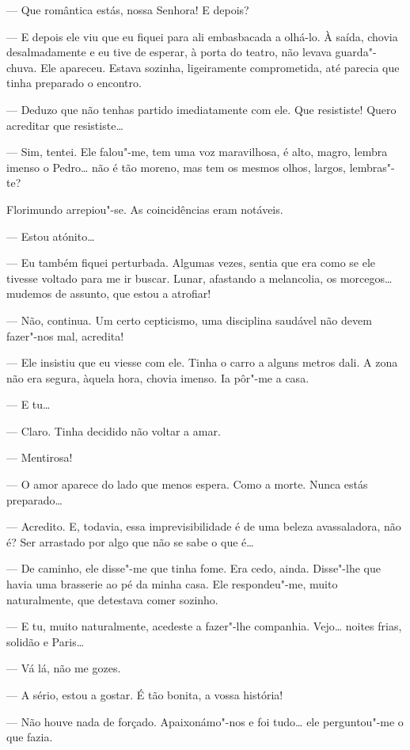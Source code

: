 --- Que romântica estás, nossa Senhora! E depois?

--- E depois ele viu que eu fiquei para ali embasbacada a olhá-lo. À
saída, chovia desalmadamente e eu tive de esperar, à porta do teatro,
não levava guarda"-chuva. Ele apareceu. Estava sozinha, ligeiramente
comprometida, até parecia que tinha preparado o encontro.

--- Deduzo que não tenhas partido imediatamente com ele. Que resististe!
Quero acreditar que resististe\ldots{}

--- Sim, tentei. Ele falou"-me, tem uma voz maravilhosa, é alto, magro,
lembra imenso o Pedro\ldots{} não é tão moreno, mas tem os mesmos olhos,
largos, lembras"-te?

Florimundo arrepiou"-se. As coincidências eram notáveis.

--- Estou atónito\ldots{}

--- Eu também fiquei perturbada. Algumas vezes, sentia que era como se ele
tivesse voltado para me ir buscar. Lunar, afastando a melancolia, os
morcegos\ldots{} mudemos de assunto, que estou a atrofiar!

--- Não, continua. Um certo cepticismo, uma disciplina saudável não devem
fazer"-nos mal, acredita!

--- Ele insistiu que eu viesse com ele. Tinha o carro a alguns metros
dali. A zona não era segura, àquela hora, chovia imenso. Ia pôr"-me a
casa.

--- E tu\ldots{}

--- Claro. Tinha decidido não voltar a amar.

--- Mentirosa!

--- O amor aparece do lado que menos espera. Como a morte. Nunca estás
preparado\ldots{}

--- Acredito. E, todavia, essa imprevisibilidade é de uma beleza
avassaladora, não é? Ser arrastado por algo que não se sabe o que é\ldots{}

--- De caminho, ele disse"-me que tinha fome. Era cedo, ainda. Disse"-lhe
que havia uma brasserie ao pé da minha casa. Ele respondeu"-me, muito
naturalmente, que detestava comer sozinho.

--- E tu, muito naturalmente, acedeste a fazer"-lhe companhia. Vejo\ldots{}
noites frias, solidão e Paris\ldots{}

--- Vá lá, não me gozes.

--- A sério, estou a gostar. É tão bonita, a vossa história!

--- Não houve nada de forçado. Apaixonámo"-nos e foi tudo\ldots{} ele
perguntou"-me o que fazia.

